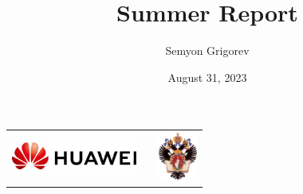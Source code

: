 \documentclass[xcolor=table,aspectratio=169]{beamer}
\title[Research Group Report]{Summer Report}
\institute[SPbSU]{
Saint Petersburg State University
}
\author[Semyon Grigorev]{Semyon Grigorev}
\date{August 31, 2023}
\begin{document}
{
\begin{frame}[fragile]
  \begin{table}
  \centering
  \begin{tabularx}{\linewidth}{XcX}
    \includegraphics[height=0.9cm]{pictures/hu_logo.jpeg} \hfill
    & 
    & \hfill \includegraphics[height=1.6cm]{pictures/SPbGU_Logo.png}
  \end{tabularx}
  \end{table}
  \titlepage
\end{frame}
}

\end{document}
